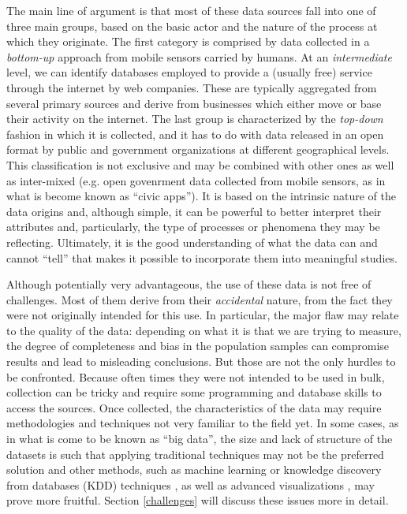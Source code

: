 \documentclass[12pt]{article}
\begin{document}
The main line of argument is that most of these data sources fall
into one of three main groups, based on the basic actor and the nature of
the process at which they originate.
The first category is comprised by data collected in a \emph{bottom-up}
approach from mobile sensors carried by humans.
At an \emph{intermediate} level, we can identify databases employed to provide
a (usually free) service through the internet by web companies. These are
typically aggregated from several primary sources and derive from businesses
which either move or base their activity on the internet.
The last group is characterized by the \emph{top-down} fashion in which it is
collected, and it has to do with data released in an open format by public and
government organizations at different geographical levels.
%
This classification is not exclusive and may be combined with other ones as
well as inter-mixed (e.g. open govenrment data collected from mobile sensors,
as in what is become known as ``civic apps''). It is based on the intrinsic nature of the data origins
and, although simple, it can be powerful to better interpret their attributes and,
particularly, the type of processes or phenomena they may be reflecting.
Ultimately, it is the good understanding of what the data can and cannot
``tell'' that makes it possible to incorporate them into meaningful studies.

Although potentially very advantageous, the use of these data is not free of
challenges. Most of them derive from their \emph{accidental} nature, from the
fact they were not originally intended for this use. 
In particular, the major flaw may relate to the quality of the data: depending on what it is
that we are trying to measure, the degree of completeness and bias in the
population samples can compromise results and lead to misleading conclusions.
But those are not the only hurdles to be confronted. Because often times they
were not intended to be used in bulk, collection can be tricky and require
some programming and database skills to access the sources.
Once collected, the characteristics of the data may require methodologies and
techniques not very familiar to the field yet. In some cases, as
in what is come to be known as ``big data'', the size and lack of structure of the
datasets is such that applying traditional techniques may not be the preferred
solution and other methods, such as machine learning
\citep{Bishop:2006:PRM:1162264} or knowledge discovery
from databases (KDD) techniques \citep{JORS:JORS641}, as well as advanced
visualizations \citep{cheshireattyepb2012}, may prove more fruitful.
%
Section \ref{challenges} will discuss these issues more in detail.
\end{document}
